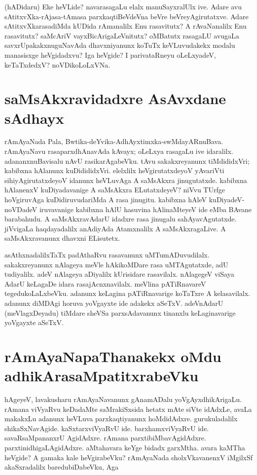 (hADidaru) Eke heVLide? navarasagaLu elalx manuSayxralUlx ive. Adare avu sAtitxvXka-rAjasa-tAmasa parxkaqtiBeVdeVna beVre beVreyAgirutatxve. Adare sAtitxvXkarasadiMda kUDida rAmanalilx Enu rasavitutx? A rAvaNanalilx Enu rasavitutx? saMcAriV vayxBicArigaLeVnitutx? oMBatutx rasagaLU avugaLa savxrUpakakxnuguNavAda dhavxniyanunx koTuTx keVLuvudakekx modalu manasisxge  heVgidadxvu? Iga heVgide? I parivataRneyu oLeLxyadeV, keTaTxdedxV? noVDikoLoLxVNa. 

\section*{saMsAkxravidadxre AsAvxdane sAdhayx} 

rAmAyaNada Pala, Bwtika-deYvika-AdhAyxtimxka-swMdayARnuBava. rAmAyaNavu rasaparxdhAnavAda kAvayx; oLeLxya rasagaLu ive idaralilx. adananxnuBavisalu nAvU rasikarAgabeVku. tAvu sakakxreyanunx tiMdididxVri; kabibxna hAlanunx kuDidididxVri. elelxlilx heVgirutatxdeyoV yAvariVti sihiyAgirutatxdeyoV idanunx heVLuvAga A saMsAkxra jinugutatxde. kabibxna hAlanenxV kuDiyadavanige A saMsAkxra ELutatxdeyeV? niVvu TUrfge hoVgiruvAga kuDidiruvudariMda A rasa jinugitu. kabibxna hAleV kuDiyadeV-noVDadeV iruvavanige kabibxna hAlU hasuvina hAlinaMteyeV ide eMba BAvane barabahudu. A saMsAkxravAdarU idadxre rasa jinugalu sahAyavAgutatxde. jiVvigaLa haqdayadalilx anAdiyAda Atamxnalilx A saMsAkxragaLive. A saMsAkxravanunx dhavxni ELisutetx. 

asAthxnadalilxTaTx padAthaRvu rasavanunx uMTumADuvudilalx. sakakxreyanunx nAlageya meVle hAkikoMDare rasa uMTAgutatxde, adU tudiyalilx. adeV nAlageya aDiyalilx kUrisidare rasavilalx. nAlagegeV viSaya AdarU keLagaDe idara rasajAcnxnavilalx. meVlina pATiRnavareV tegedukoLaLxbeVku. adanunx keLagina pATiRnavarige koTaTxre A kelasavilalx. adanunx diMDAgi horuva yoVgayxte ide adakekx aSeTxV. adeVnAdarU (meVlagxDeyadu) tiMdare sheVSa parxsAdavanunx tinanxlu keLaginavarige yoVgayxte aSeTxV. 

\section*{rAmAyaNapaThanakekx oMdu adhikArasaMpatitxrabeVku} 

hAgeyeV, lavakusharu rAmAyaNavanunx gAnamADalu yoVgAyxdhikArigaLu. rAmana viVyaRvu keDadaMte saMrakiSxsida hetatx mAte siVte idAdxLe, avaLa makakxLu adanunx heVLuva parxkaqtiyanunx hoMdidAdxre. gurukuladalilx shikaSxNavAgide. kaSxtarxviVyaRvU ide. barxhamxviVyaRvU ide. savaRsaMpananxrU AgidAdxre. rAmana parxtibiMbavAgidAdxre. parxtinidhigaLAgidAdxre. aMtahavara keYge bidadx garxMtha. avara kaMTha heVgide? A gamaka kale heVgirabeVku? rAmAyaNada sholxVkavanenxV iMgilxSf akaSxradalilx baredubiDabeVku, Aga 

